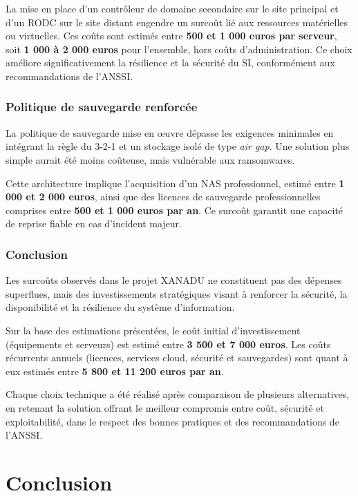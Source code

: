 \noindent La mise en place d’un contrôleur de domaine secondaire sur le site principal et d’un RODC sur le site distant engendre un surcoût lié aux ressources matérielles ou virtuelles. Ces coûts sont estimés entre \textbf{500 et 1 000 euros par serveur}, soit \textbf{1 000 à 2 000 euros} pour l’ensemble, hors coûts d’administration. Ce choix améliore significativement la résilience et la sécurité du SI, conformément aux recommandations de l’ANSSI.

\subsubsection*{Politique de sauvegarde renforcée}

La politique de sauvegarde mise en œuvre dépasse les exigences minimales en intégrant la règle du 3-2-1 et un stockage isolé de type \textit{air gap}. Une solution plus simple aurait été moins coûteuse, mais vulnérable aux ransomwares.

\noindent Cette architecture implique l’acquisition d’un NAS professionnel, estimé entre \textbf{1 000 et 2 000 euros}, ainsi que des licences de sauvegarde professionnelles comprises entre \textbf{500 et 1 000 euros par an}. Ce surcoût garantit une capacité de reprise fiable en cas d’incident majeur.

\subsubsection*{Conclusion}

Les surcoûts observés dans le projet XANADU ne constituent pas des dépenses superflues, mais des investissements stratégiques visant à renforcer la sécurité, la disponibilité et la résilience du système d’information.

\noindent Sur la base des estimations présentées, le coût initial d’investissement (équipements et serveurs) est estimé entre \textbf{3 500 et 7 000 euros}.  
Les coûts récurrents annuels (licences, services cloud, sécurité et sauvegardes) sont quant à eux estimés entre \textbf{5 800 et 11 200 euros par an}.

\noindent Chaque choix technique a été réalisé après comparaison de plusieurs alternatives, en retenant la solution offrant le meilleur compromis entre coût, sécurité et exploitabilité, dans le respect des bonnes pratiques et des recommandations de l’ANSSI.

\newpage

\section*{Conclusion}

